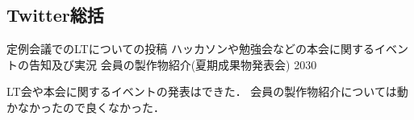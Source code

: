 \subsection*{Twitter総括}

定例会議でのLTについての投稿
ハッカソンや勉強会などの本会に関するイベントの告知及び実況
会員の製作物紹介(夏期成果物発表会) 2030

LT会や本会に関するイベントの発表はできた．
会員の製作物紹介については動かなかったので良くなかった．
